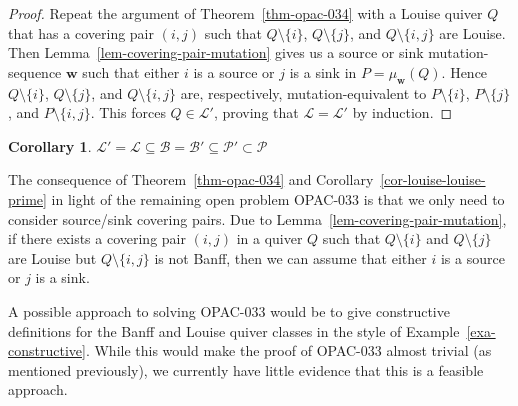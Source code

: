 \documentclass[10pt]{amsart}
\newtheorem{coro}[thm]{Corollary}
\theoremstyle{definition}
\theoremstyle{remark}
\newcommand{\BB}{\mathcal{B}}
\newcommand{\PP}{\mathcal{P}}
\newcommand{\LL}{\mathcal{L}}
\newcommand{\bw}{{\boldsymbol{w}}}
\begin{document}
\begin{proof}
    Repeat the argument of Theorem~\ref{thm-opac-034} with a Louise quiver $Q$ that has a covering pair $(i,j)$ such that $Q \setminus \{i\}$, $Q \setminus \{j\}$, and $Q \setminus \{i,j\}$ are Louise.
    Then Lemma~\ref{lem-covering-pair-mutation} gives us a source or sink mutation-sequence $\bw$ such that either $i$ is a source or $j$ is a sink in $P = \mu_\bw(Q)$.
    Hence $Q \setminus \{i\}$, $Q \setminus \{j\}$, and $Q \setminus \{i,j\}$ are, respectively, mutation-equivalent to $P \setminus \{i\}$, $P \setminus \{j\}$, and $P \setminus \{i,j\}$.
    This forces $Q \in \LL'$, proving that $\LL = \LL'$ by induction.
\end{proof}

\begin{coro} \label{cor-subclasses-all}
    $\LL' = \LL \subseteq \BB = \BB' \subseteq \PP' \subset \PP$
\end{coro}

The consequence of Theorem~\ref{thm-opac-034} and Corollary~\ref{cor-louise-louise-prime} in light of the remaining open problem OPAC-033 is that we only need to consider source/sink covering pairs. 
Due to Lemma~\ref{lem-covering-pair-mutation}, if there exists a covering pair $(i,j)$ in a quiver $Q$ such that $Q \setminus \{i\}$ and $Q \setminus \{j\}$ are Louise but $Q \setminus \{i,j\}$ is not Banff, then we can assume that either $i$ is a source or $j$ is a sink.

A possible approach to solving OPAC-033 would be to give constructive definitions for the Banff and Louise quiver classes in the style of Example~\ref{exa-constructive}. 
While this would make the proof of OPAC-033 almost trivial (as mentioned previously), we currently have little evidence that this is a feasible approach.
\end{document}
